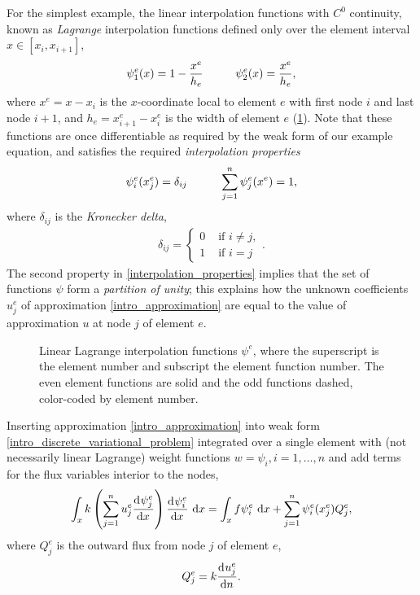 For the simplest example, the linear interpolation functions with $C^0$ continuity, known as  \emph{Lagrange} interpolation functions defined only over the element interval $x \in [x_i, x_{i+1}]$,
\begin{align}
  \label{linear_lagrange_functions}
  \psi_1^e(x) = 1 - \frac{x^e}{h_e} \hspace{10mm} \psi_2^e(x) = \frac{x^e}{h_e},
\end{align}
where $x^e = x - x_i$ is the $x$-coordinate local to element $e$ with first node $i$ and last node $i+1$, and $h_e = x_{i+1}^e - x_i^e$ is the width of element $e$ (\cref{lagrange_ftns_image}).  Note that these functions are once differentiable as required by the weak form of our example equation, and satisfies the required  \emph{interpolation properties}
\begin{align}
  \label{interpolation_properties}
  \psi_i^e(x_j^e) = \delta_{ij} \hspace{10mm} \sum_{j=1}^n \psi_j^e(x^e) = 1,
\end{align}
where $\delta_{ij}$ is the  \emph{Kronecker delta},
\begin{align*}
  \delta_{ij} = \begin{cases}
                  0 & \text{ if } i \neq j,\\
                  1 & \text{ if } i = j
                \end{cases}.
\end{align*}
The second property in \cref{interpolation_properties} implies that the set of functions $\psi$ form a \emph{partition of unity}; this explains how the unknown coefficients $u_j^e$ of approximation \cref{intro_approximation} are equal to the value of approximation $u$ at node $j$ of element $e$.

\begin{figure}
  \centering
    \def\svgwidth{\linewidth}
    
  \caption[linear Lagrange shape functions]{Linear Lagrange interpolation functions $\psi^e$, where the superscript is the element number and subscript the element function number.  The even element functions are solid and the odd functions dashed, color-coded by element number.}
    \label{lagrange_ftns_image}
\end{figure}

Inserting approximation \cref{intro_approximation} into weak form \cref{intro_discrete_variational_problem} integrated over a single element with (not necessarily linear Lagrange) weight functions $w = \psi_i, i = 1,\ldots,n$ and add terms for the flux variables interior to the nodes,
\begin{align}
  \label{intro_element_form}
  \int_x k \left( \sum_{j=1}^n u_j^e \frac{\mathrm{d}{^{}} \psi_j^e}{\mathrm{d} x{^{}} } \right) \frac{\mathrm{d}{^{}} \psi_i^e}{\mathrm{d} x{^{}} } \ \mathrm{d}x = \int_x f \psi_i^e \ \mathrm{d}x + \sum_{j=1}^n \psi_i^e(x_j^e) Q_j^e,
\end{align}
where $Q_j^e$ is the outward flux from node $j$ of element $e$,
\begin{align*}
  Q_j^e = k \frac{\mathrm{d}{^{}} u_j^e}{\mathrm{d} n{^{}} }.
\end{align*}

